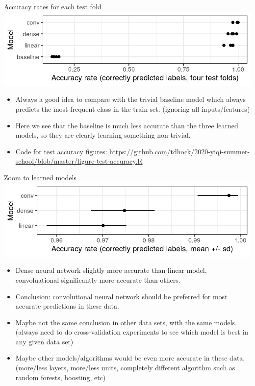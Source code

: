 \documentclass{article}
\begin{document}
{Accuracy rates for each test fold}
  \includegraphics[width=\textwidth]{figure-test-accuracy-baseline}
  \begin{itemize}
  \item Always a good idea to compare with the trivial baseline model which always
    predicts the most frequent class in the train set. (ignoring all
    inputs/features) 
  \item Here we see that the baseline is much less accurate than the
    three learned models, so they are clearly learning something non-trivial.
  \item Code for test accuracy figures:
    \url{https://github.com/tdhock/2020-yiqi-summer-school/blob/master/figure-test-accuracy.R}
  \end{itemize}

{Zoom to learned models}
  \includegraphics[width=\textwidth]{figure-test-accuracy}
  \begin{itemize}
  \item Dense neural network slightly more accurate
    than linear model, convoluational significantly more
    accurate than others.
  \item Conclusion: convolutional neural network should be preferred
    for most accurate predictions in these data.
  \item Maybe not the same conclusion in other data sets, with the
    same models. (always need to do cross-validation experiments to
    see which model is best in any given data set)
  \item Maybe other models/algorithms would be even more accurate in
    these data. (more/less layers, more/less units, completely
    different algorithm such as random forests, boosting, etc)
  \end{itemize}
\end{document}
